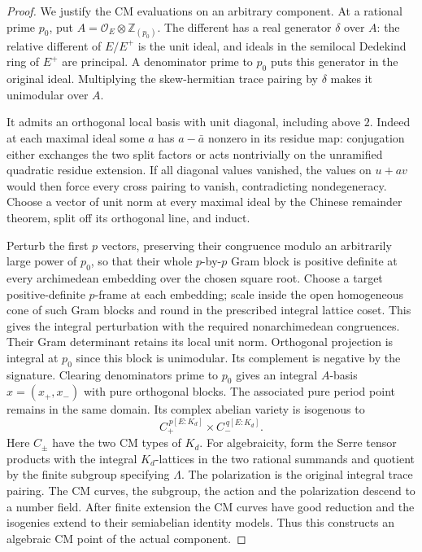 \begin{proof}
We justify the CM evaluations on an arbitrary component.
At a rational prime \(p_0\), put
\(A=\mathcal O_E\otimes\mathbb Z_{(p_0)}\).
The different has a real generator \(\delta\) over \(A\):
the relative different of \(E/E^+\) is the unit ideal, and
ideals in the semilocal Dedekind ring of \(E^+\) are principal.
A denominator prime to \(p_0\) puts this generator in the
original ideal.
Multiplying the skew-hermitian trace pairing by \(\delta\)
makes it unimodular over \(A\).

It admits an orthogonal local basis with unit diagonal, including
above \(2\).  Indeed at each maximal ideal some \(a\) has
\(a-\bar a\) nonzero in its residue map: conjugation either
exchanges the two split factors or acts nontrivially on the
unramified quadratic residue extension.
If all diagonal values vanished, the values on \(u+av\)
would then force every cross pairing to vanish, contradicting
nondegeneracy.  Choose a vector of unit norm at every maximal
ideal by the Chinese remainder theorem, split off its orthogonal
line, and induct.

Perturb the first \(p\) vectors, preserving their congruence
modulo an arbitrarily large power of \(p_0\), so that their
whole \(p\)-by-\(p\) Gram block is positive definite at every
archimedean embedding over the chosen square root.
Choose a target positive-definite \(p\)-frame at each embedding;
scale inside the open homogeneous cone of such Gram blocks
and round in the prescribed integral lattice coset.
This gives the integral perturbation with the required
nonarchimedean congruences.
Their Gram determinant retains its local unit norm.
Orthogonal projection is integral at \(p_0\) since this block
is unimodular.  Its complement is negative by the signature.
Clearing denominators prime to \(p_0\) gives an integral
\(A\)-basis \(x=(x_+,x_-)\) with pure orthogonal blocks.
The associated pure period point remains in the same domain.
Its complex abelian variety is isogenous to
\[
             C_+^{\,p[E:K_d]}\times C_-^{\,q[E:K_d]} .
 \tag{FD10}
\]
Here \(C_\pm\) have the two CM types of \(K_d\).
For algebraicity, form the Serre tensor products with the
integral \(K_d\)-lattices in the two rational summands and quotient
by the finite subgroup specifying \(\Lambda\).
The polarization is the original integral trace pairing.
The CM curves, the subgroup, the action and the polarization
descend to a number field.  After finite extension the CM
curves have good reduction and the isogenies extend to their
semiabelian identity models.  Thus this constructs an algebraic
CM point of the actual component.


\end{proof}
